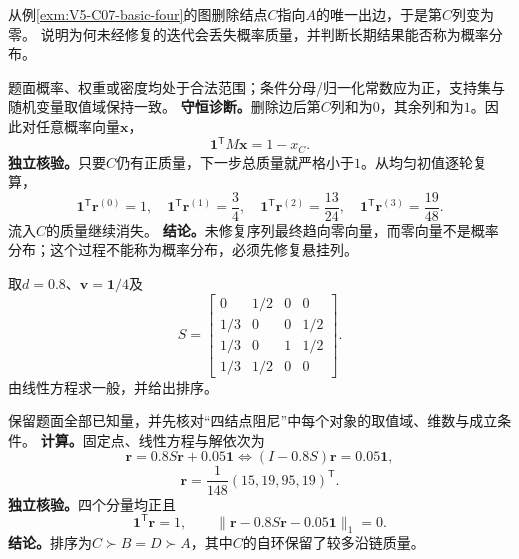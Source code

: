 \begin{example}[删除一条边后的概率质量流失]\label{exm:V5-C07-dangling-loss}
从例\ref{exm:V5-C07-basic-four}的图删除结点$C$指向$A$的唯一出边，于是第$C$列变为零。
说明为何未经修复的迭代会丢失概率质量，并判断长期结果能否称为\PageRank{}概率分布。
\end{example}
\begin{solution}
\SolGiven 题面概率、权重或密度均处于合法范围；条件分母/归一化常数应为正，支持集与随机变量取值域保持一致。
\SolDerive
\textbf{守恒诊断。}删除边后第$C$列和为$0$，其余列和为$1$。因此对任意概率向量$\boldsymbol x$，
\[
\boldsymbol1^{\mathsf T}M\boldsymbol x=1-x_C.
\]
\textbf{独立核验。}只要$C$仍有正质量，下一步总质量就严格小于$1$。从均匀初值逐轮复算，
\[
\boldsymbol1^{\mathsf T}\boldsymbol r^{(0)}=1,\quad
\boldsymbol1^{\mathsf T}\boldsymbol r^{(1)}=\frac34,\quad
\boldsymbol1^{\mathsf T}\boldsymbol r^{(2)}=\frac{13}{24},\quad
\boldsymbol1^{\mathsf T}\boldsymbol r^{(3)}=\frac{19}{48}.
\]
流入$C$的质量继续消失。
\textbf{结论。}未修复序列最终趋向零向量，而零向量不是概率分布；这个过程不能称为\PageRank{}概率分布，必须先修复悬挂列。
\end{solution}

\begin{example}\label{exm:V5-C07-damped-four}
取$d=0.8$、$\boldsymbol v=\boldsymbol1/4$及
\[
S=\begin{bmatrix}
0&1/2&0&0\\1/3&0&0&1/2\\1/3&0&1&1/2\\1/3&1/2&0&0
\end{bmatrix}.
\]
由线性方程求一般\PageRank{}，并给出排序。
\end{example}
\begin{solution}
\SolGiven 保留题面全部已知量，并先核对“四结点阻尼”中每个对象的取值域、维数与成立条件。
\SolDerive
\textbf{计算。}固定点、线性方程与解依次为
\[
\boldsymbol r=0.8S\boldsymbol r+0.05\boldsymbol1
\Longleftrightarrow
(I-0.8S)\boldsymbol r=0.05\boldsymbol1,
\]
\[
\boldsymbol r=\frac1{148}(15,19,95,19)^{\mathsf T}.
\]
\textbf{独立核验。}四个分量均正且
\[
\boldsymbol1^{\mathsf T}\boldsymbol r=1,\qquad
\|\boldsymbol r-0.8S\boldsymbol r-0.05\boldsymbol1\|_1=0.
\]
\textbf{结论。}排序为$C\succ B=D\succ A$，其中$C$的自环保留了较多沿链质量。
\end{solution}

